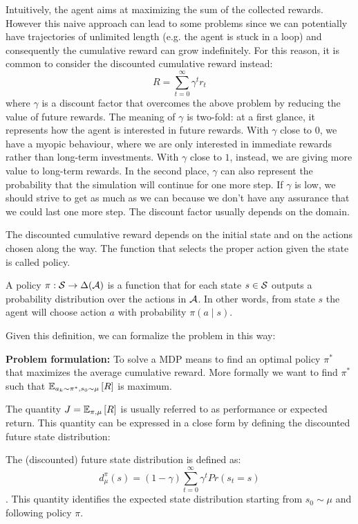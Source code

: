 Intuitively, the agent aims at maximizing the sum of the collected rewards. However this naive approach can lead to some problems since we can potentially have trajectories of unlimited length (e.g. the agent is stuck in a loop) and consequently the cumulative reward can grow indefinitely.
For this reason, it is common to consider the discounted cumulative reward instead:
\begin{equation*}
R = \sum_{t=0}^{\infty} \gamma^t r_t
\end{equation*}
where $\gamma$ is a discount factor that overcomes the above problem by reducing the value of future rewards. The meaning of $\gamma$ is two-fold: at a first glance, it represents how the agent is interested in future rewards. With $\gamma$ close to $0$, we have a myopic behaviour, where we are only interested in immediate rewards rather than long-term investments. With $\gamma$ close to $1$, instead, we are giving more value to long-term rewards. In the second place, $\gamma$ can also represent the probability that the simulation will continue for one more step. If $\gamma$ is low, we should strive to get as much as we can because we don't have any assurance that we could last one more step.
The discount factor usually depends on the domain. 


The discounted cumulative reward depends on the initial state and on the actions chosen along the way. The function that selects the proper action given the state is called policy.

\begin{definition}
A policy $\pi: \sspace \rightarrow \Delta (\aspace)$ is a function that for each state $s \in \sspace$ outputs a probability distribution over the actions in $\aspace$. In other words, from state $s$ the agent will choose action $a$ with probability $\pi(a \mid s)$.
\end{definition}

Given this definition, we can formalize the problem in this way:

\textbf{Problem formulation:}\quad
To solve a MDP means to find an optimal policy $\pi^*$ that maximizes the average cumulative reward. More formally we want to find $\pi^*$ such that $\EV[a_k \sim \pi^*, s_0 \sim \mu]{R}$ is maximum.


The quantity $J = \EV[\pi, \mu]{R}$ is usually referred to as performance or expected return. This quantity can be expressed in a close form by defining the discounted future state distribution:

\begin{definition}
The (discounted) future state distribution is defined as: 
\[
d_{\mu}^{\pi}(s) = (1-\gamma)\sum_{t=0}^{\infty} \gamma^t Pr(s_t = s)
\]. 
This quantity identifies the expected state distribution starting from $s_0 \sim \mu$ and following policy $\pi$. 
\end{definition}

